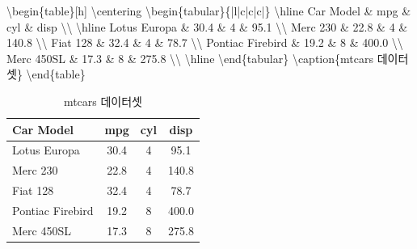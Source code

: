 \documentclass[
  letterpaper,
]{book}
\newenvironment{Shaded}{\begin{snugshade}}{\end{snugshade}}
\newcommand{\ExtensionTok}[1]{\textcolor[rgb]{0.00,0.23,0.31}{#1}}
\newcommand{\FunctionTok}[1]{\textcolor[rgb]{0.28,0.35,0.67}{#1}}
\newcommand{\KeywordTok}[1]{\textcolor[rgb]{0.00,0.23,0.31}{#1}}
\newcommand{\NormalTok}[1]{\textcolor[rgb]{0.00,0.23,0.31}{#1}}
\newcommand{\OperatorTok}[1]{\textcolor[rgb]{0.37,0.37,0.37}{#1}}
\begin{document}
\begin{Shaded}
\begin{Highlighting}[]
\KeywordTok{\textbackslash{}begin}\NormalTok{\{}\ExtensionTok{table}\NormalTok{\}[h]}
\FunctionTok{\textbackslash{}centering}
\KeywordTok{\textbackslash{}begin}\NormalTok{\{}\ExtensionTok{tabular}\NormalTok{\}\{|l|c|c|c|\}}
\FunctionTok{\textbackslash{}hline}
\NormalTok{Car Model }\OperatorTok{\&}\NormalTok{ mpg }\OperatorTok{\&}\NormalTok{ cyl }\OperatorTok{\&}\NormalTok{ disp }\FunctionTok{\textbackslash{}\textbackslash{}}
\FunctionTok{\textbackslash{}hline}
\NormalTok{Lotus Europa }\OperatorTok{\&}\NormalTok{ 30.4 }\OperatorTok{\&}\NormalTok{ 4 }\OperatorTok{\&}\NormalTok{ 95.1 }\FunctionTok{\textbackslash{}\textbackslash{}}
\NormalTok{Merc 230 }\OperatorTok{\&}\NormalTok{ 22.8 }\OperatorTok{\&}\NormalTok{ 4 }\OperatorTok{\&}\NormalTok{ 140.8 }\FunctionTok{\textbackslash{}\textbackslash{}}
\NormalTok{Fiat 128 }\OperatorTok{\&}\NormalTok{ 32.4 }\OperatorTok{\&}\NormalTok{ 4 }\OperatorTok{\&}\NormalTok{ 78.7 }\FunctionTok{\textbackslash{}\textbackslash{}}
\NormalTok{Pontiac Firebird }\OperatorTok{\&}\NormalTok{ 19.2 }\OperatorTok{\&}\NormalTok{ 8 }\OperatorTok{\&}\NormalTok{ 400.0 }\FunctionTok{\textbackslash{}\textbackslash{}}
\NormalTok{Merc 450SL }\OperatorTok{\&}\NormalTok{ 17.3 }\OperatorTok{\&}\NormalTok{ 8 }\OperatorTok{\&}\NormalTok{ 275.8 }\FunctionTok{\textbackslash{}\textbackslash{}}
\FunctionTok{\textbackslash{}hline}
\KeywordTok{\textbackslash{}end}\NormalTok{\{}\ExtensionTok{tabular}\NormalTok{\}}
\FunctionTok{\textbackslash{}caption}\NormalTok{\{mtcars 데이터셋\}}
\KeywordTok{\textbackslash{}end}\NormalTok{\{}\ExtensionTok{table}\NormalTok{\}}
\end{Highlighting}
\end{Shaded}

\begin{table}[h]
\centering
\begin{tabular}{|l|c|c|c|}
\hline
Car Model & mpg & cyl & disp \\
\hline
Lotus Europa & 30.4 & 4 & 95.1 \\
Merc 230 & 22.8 & 4 & 140.8 \\
Fiat 128 & 32.4 & 4 & 78.7 \\
Pontiac Firebird & 19.2 & 8 & 400.0 \\
Merc 450SL & 17.3 & 8 & 275.8 \\
\hline
\end{tabular}
\caption{mtcars 데이터셋}
\end{table}
\end{document}
